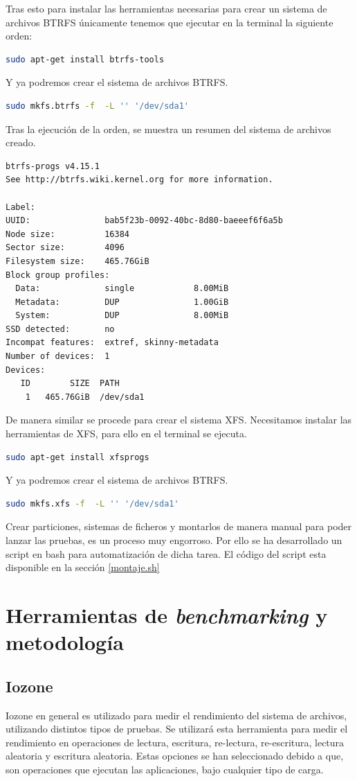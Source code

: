 Tras esto para instalar las herramientas necesarias para crear un sistema de archivos BTRFS únicamente tenemos que ejecutar en la terminal la siguiente orden:
\begin{lstlisting}[language=bash]
sudo apt-get install btrfs-tools
\end{lstlisting}
Y ya podremos crear el sistema de archivos BTRFS.
\begin{lstlisting}[language=bash]
sudo mkfs.btrfs -f  -L '' '/dev/sda1'
\end{lstlisting}
Tras la ejecución de la orden, se muestra un resumen del sistema de archivos creado.
\begin{lstlisting}[language=bash]
btrfs-progs v4.15.1
See http://btrfs.wiki.kernel.org for more information.

Label:
UUID:               bab5f23b-0092-40bc-8d80-baeeef6f6a5b
Node size:          16384
Sector size:        4096
Filesystem size:    465.76GiB
Block group profiles:
  Data:             single            8.00MiB
  Metadata:         DUP               1.00GiB
  System:           DUP               8.00MiB
SSD detected:       no
Incompat features:  extref, skinny-metadata
Number of devices:  1
Devices:
   ID        SIZE  PATH
    1   465.76GiB  /dev/sda1

\end{lstlisting}

De manera similar se procede para crear el sistema XFS. Necesitamos instalar las herramientas de XFS, para ello en el terminal se ejecuta. 
\begin{lstlisting}[language=bash]
sudo apt-get install xfsprogs
\end{lstlisting}
Y ya podremos crear el sistema de archivos BTRFS.
\begin{lstlisting}[language=bash]
sudo mkfs.xfs -f  -L '' '/dev/sda1'
\end{lstlisting}

Crear particiones, sistemas de ficheros y montarlos de manera manual para poder lanzar las pruebas, es un proceso muy engorroso. Por ello se ha desarrollado un script en bash para automatización de dicha tarea. El código del script esta disponible en la sección \ref{montaje.sh}

\section{Herramientas de \textit{benchmarking} y metodología}
\subsection{Iozone}\label{metodologia_iozone}
Iozone en general es utilizado para medir el rendimiento del sistema de archivos, utilizando distintos tipos de pruebas. Se utilizará esta herramienta para medir el rendimiento en operaciones de lectura, escritura, re-lectura, re-escritura, lectura aleatoria y escritura aleatoria. Estas opciones se han seleccionado debido a que, son operaciones que ejecutan las aplicaciones, bajo cualquier tipo de carga.

